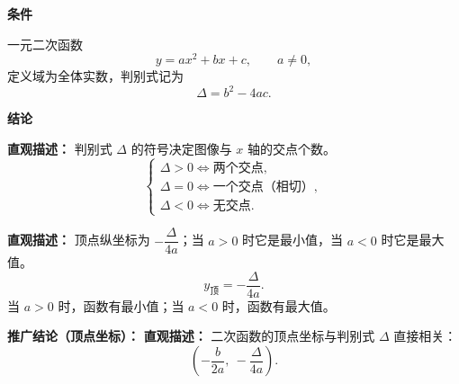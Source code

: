 \begin{statementbox}
	\textbf{\textcolor{CStatement}{条件}}
	\begin{description}[style=nextline, leftmargin=2.8em, labelsep=0.5em, itemsep=0.35em]
		\item[\textbf{\textcolor{CStatement}{条件 1（函数形式）：}}]
		      一元二次函数
		      \[
			      y=ax^2+bx+c,\qquad a\neq0,
		      \]
		      定义域为全体实数，判别式记为
		      \[
			      \Delta=b^2-4ac.
		      \]
	\end{description}

	\textbf{\textcolor{CStatement}{结论}}
	\begin{description}[style=nextline, leftmargin=2.8em, labelsep=0.5em, itemsep=0.45em]
		\item[\textbf{\textcolor{CStatement}{结论一（交点个数）：}}]
		      \textbf{\textcolor{CStatement}{直观描述：}} 判别式 $\Delta$ 的符号决定图像与 $x$ 轴的交点个数。
		      \[
			      \begin{cases}
				      \Delta>0 \iff \text{两个交点},     \\
				      \Delta=0 \iff \text{一个交点（相切）}, \\
				      \Delta<0 \iff \text{无交点}.
			      \end{cases}
		      \]

		\item[\textbf{\textcolor{CStatement}{结论二（顶点纵坐标与最值）：}}]
		      \textbf{\textcolor{CStatement}{直观描述：}} 顶点纵坐标为 $-\dfrac{\Delta}{4a}$；当 $a>0$ 时它是最小值，当 $a<0$ 时它是最大值。
		      \[
			      y_{\text{顶}}=-\frac{\Delta}{4a}.
		      \]
		      当 $a>0$ 时，函数有最小值；当 $a<0$ 时，函数有最大值。
	\end{description}

	\textbf{\textcolor{CStatement}{推广结论（顶点坐标）：}}
	\textbf{\textcolor{CStatement}{直观描述：}} 二次函数的顶点坐标与判别式 $\Delta$ 直接相关：
	\[
		\left(-\frac{b}{2a},\ -\frac{\Delta}{4a}\right).
	\]
\end{statementbox}